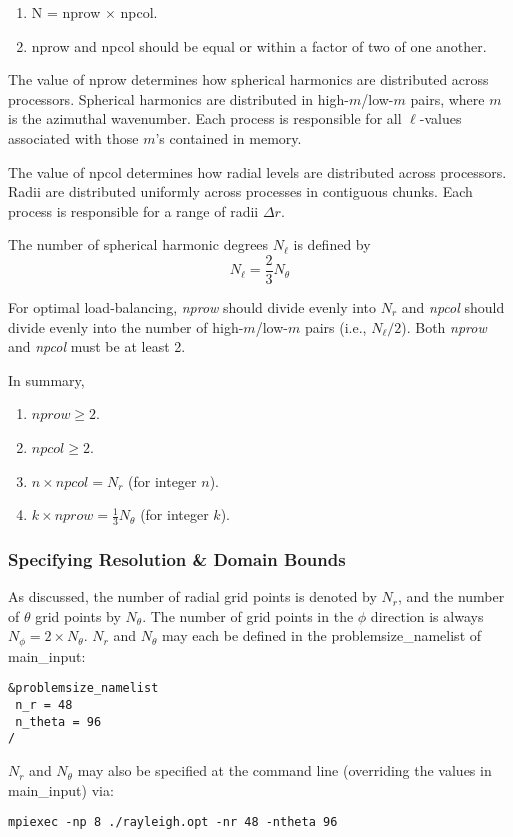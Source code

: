 \begin{enumerate}
\item N = nprow $\times$ npcol.
\item nprow and npcol should be equal or within a factor of two of one another.
\end{enumerate}

The value of nprow determines how spherical harmonics are distributed across processors.   Spherical harmonics are distributed in high-$m$/low-$m$ pairs, where $m$ is the azimuthal wavenumber.  Each process is responsible for all $\ell$-values associated with those $m$'s contained in memory.

The value of npcol determines how radial levels are distributed across processors.  Radii are distributed uniformly across processes in contiguous chunks.  Each process is responsible for a range of radii $\Delta r$.

The number of spherical harmonic degrees $N_\ell$ is defined by
\begin{equation}
N_\ell = \frac{2}{3}N_\theta
\end{equation}

For optimal load-balancing, \textit{nprow} should divide evenly into $N_r$ and \textit{npcol} should divide evenly into the number of high-$m$/low-$m$ pairs (i.e., $N_\ell/2$).  Both \textit{nprow} and \textit{npcol} must be at least 2.

In summary,
\begin{enumerate}
\item $nprow \ge 2$.
\item $npcol \ge 2$.
\item $n \times npcol = N_r$ (for integer $n$).
\item $k \times nprow = \frac{1}{3}N_\theta$ (for integer $k$).
\end{enumerate}

\subsubsection{Specifying Resolution \& Domain Bounds}
As discussed, the number of radial grid points is denoted by $N_r$, and the number of $\theta$ grid points by $N_\theta$.  The number of grid points in the $\phi$ direction is always $N_\phi=2\times N_\theta$.  $N_r$ and $N_\theta$ may each be defined in the problemsize\_namelist of main\_input:
\begin{lstlisting}
&problemsize_namelist
 n_r = 48
 n_theta = 96
/
\end{lstlisting}
$N_r$ and $N_\theta$ may also be specified at the command line (overriding the values in main\_input) via:
\begin{lstlisting}
mpiexec -np 8 ./rayleigh.opt -nr 48 -ntheta 96
\end{lstlisting}

